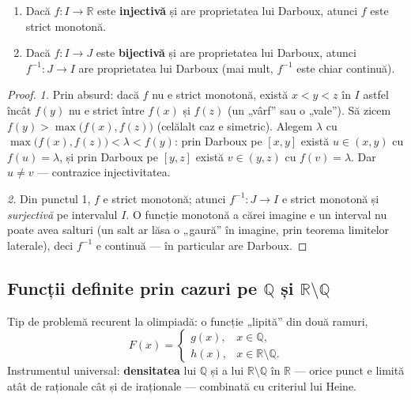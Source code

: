 \begin{teorema}
\begin{enumerate}[leftmargin=*, itemsep=1pt]
\item Dacă $f:I\to\mathbb{R}$ este \textbf{injectivă} și are proprietatea lui Darboux, atunci $f$ este strict monotonă.
\item Dacă $f:I\to J$ este \textbf{bijectivă} și are proprietatea lui Darboux, atunci $f^{-1}:J\to I$ are proprietatea lui Darboux (mai mult, $f^{-1}$ este chiar continuă).
\end{enumerate}
\end{teorema}
\begin{proof}
\emph{1.} Prin absurd: dacă $f$ nu e strict monotonă, există $x<y<z$ în $I$ astfel încât $f(y)$ nu e strict între $f(x)$ și $f(z)$ (un „vârf'' sau o „vale''). Să zicem $f(y)>\max\big(f(x),f(z)\big)$ (celălalt caz e simetric). Alegem $\lambda$ cu $\max\big(f(x),f(z)\big)<\lambda<f(y)$: prin Darboux pe $[x,y]$ există $u\in(x,y)$ cu $f(u)=\lambda$, și prin Darboux pe $[y,z]$ există $v\in(y,z)$ cu $f(v)=\lambda$. Dar $u\neq v$ --- contrazice injectivitatea.

\emph{2.} Din punctul 1, $f$ e strict monotonă; atunci $f^{-1}:J\to I$ e strict monotonă și \emph{surjectivă} pe intervalul $I$. O funcție monotonă a cărei imagine e un interval nu poate avea salturi (un salt ar lăsa o „gaură'' în imagine, prin teorema limitelor laterale), deci $f^{-1}$ e continuă --- în particular are Darboux.
\end{proof}

\subsection{Funcții definite prin cazuri pe $\mathbb{Q}$ și $\mathbb{R}\setminus\mathbb{Q}$}

Tip de problemă recurent la olimpiadă: o funcție „lipită'' din două ramuri,
\[
F(x)=\begin{cases} g(x), & x\in\mathbb{Q},\\ h(x), & x\in\mathbb{R}\setminus\mathbb{Q}.\end{cases}
\]
Instrumentul universal: \textbf{densitatea} lui $\mathbb{Q}$ și a lui $\mathbb{R}\setminus\mathbb{Q}$ în $\mathbb{R}$ --- orice punct e limită atât de raționale cât și de iraționale --- combinată cu criteriul lui Heine.

